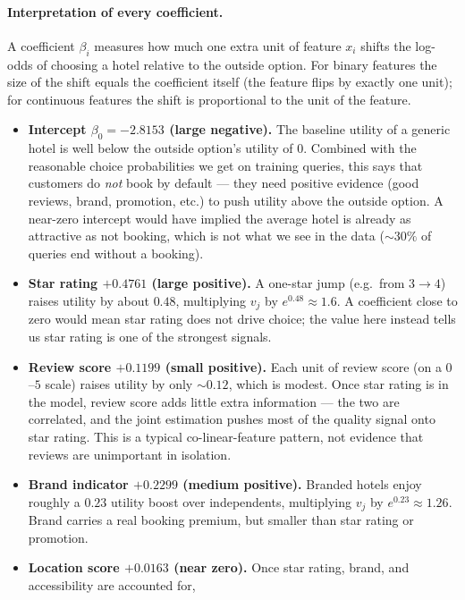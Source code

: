 \documentclass[11pt]{article}
\begin{document}
\paragraph{Interpretation of every coefficient.}
A coefficient $\beta_i$ measures how much one extra unit of feature $x_i$
shifts the log-odds of choosing a hotel relative to the outside option.
For binary features the size of the shift equals the coefficient itself
(the feature flips by exactly one unit); for continuous features the
shift is proportional to the unit of the feature.
\begin{itemize}
  \item \textbf{Intercept $\beta_0 = -2.8153$ (large negative).}
    The baseline utility of a generic hotel is well below the outside
    option's utility of $0$. Combined with the reasonable choice
    probabilities we get on training queries, this says that customers
    do \emph{not} book by default --- they need positive evidence
    (good reviews, brand, promotion, etc.) to push utility above the
    outside option. A near-zero intercept would have implied the average
    hotel is already as attractive as not booking, which is not what we
    see in the data ($\sim\!30\%$ of queries end without a booking).
  \item \textbf{Star rating $+0.4761$ (large positive).}
    A one-star jump (e.g.\ from $3\!\to\!4$) raises utility by about $0.48$,
    multiplying $v_j$ by $e^{0.48}\approx 1.6$. A coefficient close to
    zero would mean star rating does not drive choice; the value here
    instead tells us star rating is one of the strongest signals.
  \item \textbf{Review score $+0.1199$ (small positive).}
    Each unit of review score (on a $0$--$5$ scale) raises utility by
    only $\sim\!0.12$, which is modest. Once star rating is in the model,
    review score adds little extra information --- the two are
    correlated, and the joint estimation pushes most of the quality
    signal onto star rating. This is a typical co-linear-feature
    pattern, not evidence that reviews are unimportant in isolation.
  \item \textbf{Brand indicator $+0.2299$ (medium positive).}
    Branded hotels enjoy roughly a $0.23$ utility boost over independents,
    multiplying $v_j$ by $e^{0.23}\approx 1.26$. Brand carries a real
    booking premium, but smaller than star rating or promotion.
  \item \textbf{Location score $+0.0163$ (near zero).}
    Once star rating, brand, and accessibility are accounted for,

\end{itemize}
\end{document}
